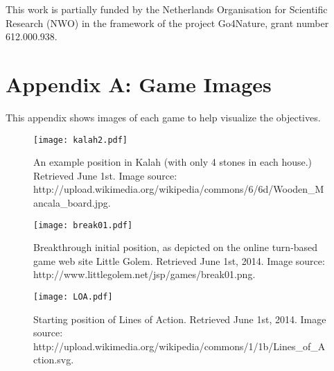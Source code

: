 \documentclass{article}
\begin{document}
{\small
{} This work is partially funded by the Netherlands 
Organisation for Scientific Research (NWO) in the framework of the project Go4Nature, grant number 612.000.938. 
}


%
%




\vspace{20cm}

\appendix

\section{Appendix A: Game Images}
\label{app:images}

This appendix shows images of each game to help visualize the objectives.


\begin{figure}[h!]
\begin{center}
\texttt{[image: kalah2.pdf]}
\end{center}
\caption{An example position in Kalah (with only 4 stones in each house.) 
Retrieved June 1st.
Image source: http://upload.wikimedia.org/wikipedia/commons/6/6d/Wooden\_Mancala\_board.jpg. \label{fig:kalah-image}}
\end{figure}

\begin{figure}[h!]
\begin{center}
\texttt{[image: break01.pdf]}
\end{center}
\caption{Breakthrough initial position, as depicted on the online turn-based game web site Little Golem. 
Retrieved June 1st, 2014. 
Image source: http://www.littlegolem.net/jsp/games/break01.png. 
\label{fig:bt-image}}
\end{figure}

\begin{figure}[h!]
\begin{center}
\texttt{[image: LOA.pdf]}
\end{center}
\caption{Starting position of Lines of Action. 
Retrieved June 1st, 2014. 
Image source: http://upload.wikimedia.org/wikipedia/commons/1/1b/Lines\_of\_Action.svg. 
\label{fig:loa-image}}
\end{figure}
\end{document}
